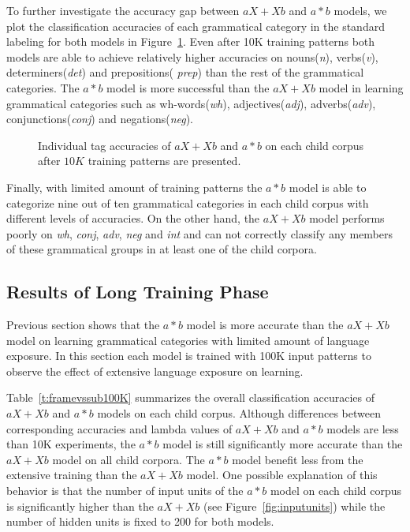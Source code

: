 To further investigate the accuracy gap between $aX+Xb$ and $a*b$ models, we
plot the classification accuracies of each grammatical category in the standard
labeling for both models in Figure~\ref{fig:category10K}.  Even after 10K
training patterns both models are able to achieve relatively higher accuracies
on nouns({\it n}), verbs({\it v}), determiners({\it det}) and prepositions({\it
prep}) than the rest of the grammatical categories.  The $a*b$ model is more
successful than the $aX+Xb$ model in learning grammatical categories such as
wh-words({\it wh}), adjectives({\it adj}), adverbs({\it adv}),
conjunctions({\it conj}) and negations({\it neg}). 

\begin{figure}[h]
 \caption{Individual tag accuracies of $aX+Xb$ and $a*b$ on each child corpus
 after $10K$ training patterns are presented.}
  \label{fig:category10K}
\end{figure}

Finally, with limited amount of training patterns the $a*b$ model is able to
categorize nine out of ten grammatical categories in each child corpus with
different levels of accuracies.  On the other hand, the $aX+Xb$ model performs
poorly on {\it wh}, {\it conj}, {\it adv}, {\it neg} and {\it int} and can not
correctly classify any members of these grammatical groups in at least one of
the child corpora.

\subsection{Results of Long Training Phase} 

Previous section shows that the $a*b$ model is more accurate than the $aX+Xb$
model on learning grammatical categories with limited amount of language
exposure.  In this section each model is trained with 100K input patterns to
observe the effect of extensive language exposure on learning.


Table~\ref{t:framevssub100K} summarizes the overall classification accuracies
of $aX+Xb$ and $a*b$ models on each child corpus.  Although differences between
corresponding accuracies and lambda values of $aX+Xb$ and $a*b$ models are less
than 10K experiments, the $a*b$ model is still significantly more accurate than
the $aX+Xb$ model on all child corpora.  The $a*b$ model benefit less from the
extensive training than the $aX+Xb$ model. One possible explanation of this
behavior is that the number of input units of the $a*b$ model on each child
corpus is significantly higher than the $aX+Xb$ (see
Figure~\ref{fig:inputunits}) while the number of hidden units is fixed to 200
for both models. 

